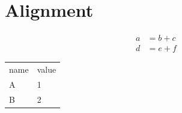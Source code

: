 \documentclass{article}
\begin{document}
\section{Alignment}
\begin{align}
  a&=b+c\\
    d &= e+f
\end{align}

\begin{tabular}{ll}
name&value\\
A&1\\
B&2
\end{tabular}
\end{document}
